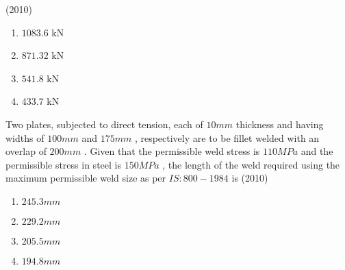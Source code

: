 	\hfill{(2010)}
		
		\begin{enumerate}
			\item $1083.6$ kN
			\item $871.32$ kN
			\item $541.8$ kN
			\item $433.7$ kN
        	\end{enumerate}
	\item Two plates, subjected to direct tension, each of $10 mm$ thickness and having widths of $100 mm$ and $175 mm$ , respectively are to be fillet welded with an overlap of $200 mm$ . Given that the permissible weld stress is $110 MPa$ and the permissible stress in steel is $150 MPa$ , the length of the weld required using the maximum permissible weld size as per $IS:800-1984$ is
	\hfill{(2010)}
		\begin{center}
   	
		\end{center}
		\newpage
		\begin{enumerate}
		       \item $245.3 mm$
		       \item $229.2 mm$
		       \item $205.5 mm$
		       \item $194.8 mm$
        	\end{enumerate}	
	

